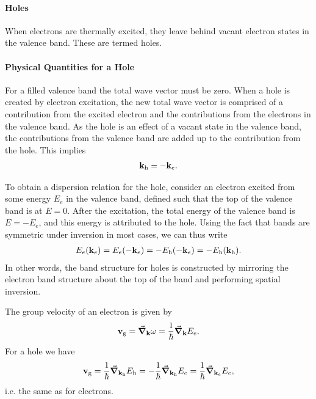 \paragraph{Holes}
When electrons are thermally excited, they leave behind vacant electron states in the valence band. These are termed holes.

\paragraph{Physical Quantities for a Hole}
For a filled valence band the total wave vector must be zero. When a hole is created by electron excitation, the new total wave vector is comprised of a contribution from the excited electron and the contributions from the electrons in the valence band. As the hole is an effect of a vacant state in the valence band, the contributions from the valence band are added up to the contribution from the hole. This implies
\begin{align*}
	\vb{k}_{\text{h}} = -\vb{k}_{e}.
\end{align*}

To obtain a dispersion relation for the hole, consider an electron excited from some energy $E_{e}$ in the valence band, defined such that the top of the valence band is at $E = 0$. After the excitation, the total energy of the valence band is $E = -E_{e}$, and this energy is attributed to the hole. Using the fact that bands are symmetric under inversion in most cases, we can thus write
\begin{align*}
	E_{e}(\vb{k}_{e}) = E_{e}(-\vb{k}_{e}) = -E_{\text{h}}(-\vb{k}_{e}) = -E_{\text{h}}(\vb{k}_{\text{h}}).
\end{align*}
In other words, the band structure for holes is constructed by mirroring the electron band structure about the top of the band and performing spatial inversion.

The group velocity of an electron is given by
\begin{align*}
	\vb{v}_{\text{g}} = \grad_{\vb{k}}{\omega} = \frac{1}{\hbar}\grad_{\vb{k}}{E_{e}}.
\end{align*}
For a hole we have
\begin{align*}
	\vb{v}_{\text{g}} = \frac{1}{\hbar}\grad_{\vb{k}_{\text{h}}}{E_{\text{h}}} = -\frac{1}{\hbar}\grad_{\vb{k}_{\text{h}}}{E_{e}} = \frac{1}{\hbar}\grad_{\vb{k}_{e}}{E_{e}},
\end{align*}
i.e. the same as for electrons.

